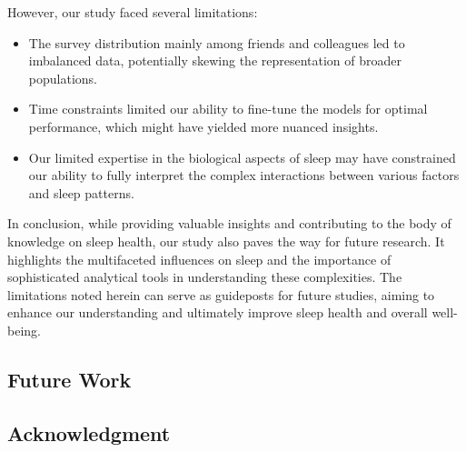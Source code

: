 \documentclass[conference]{IEEEtran}
\begin{document}
However, our study faced several limitations:
\begin{itemize}
    \item The survey distribution mainly among friends and colleagues led to imbalanced data, potentially skewing the representation of broader populations.
    \item Time constraints limited our ability to fine-tune the models for optimal performance, which might have yielded more nuanced insights.
    \item Our limited expertise in the biological aspects of sleep may have constrained our ability to fully interpret the complex interactions between various factors and sleep patterns.
\end{itemize}

In conclusion, while providing valuable insights and contributing to the body of knowledge on sleep health, our study also paves the way for future research. It highlights the multifaceted influences on sleep and the importance of sophisticated analytical tools in understanding these complexities. The limitations noted herein can serve as guideposts for future studies, aiming to enhance our understanding and ultimately improve sleep health and overall well-being.


\subsection*{Future Work}

\subsection*{Acknowledgment}


\end{document}
